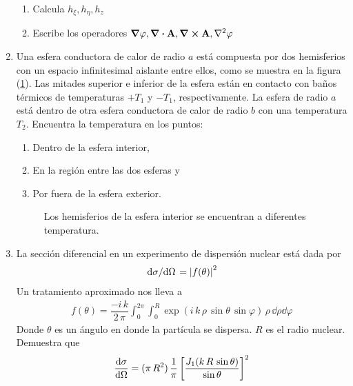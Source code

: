 \begin{enumerate}
\begin{enumerate}
    \item Calcula $h_{\xi}, h_{\eta}, h_{z}$
    \item Escribe los operadores $\grad{\varphi}, \div{\vb{A}}, \curl \vb{A}, \laplacian{\varphi}$
    \end{enumerate}
    \item Una esfera conductora de calor de radio $a$ está compuesta por dos hemisferios con un espacio infinitesimal aislante entre ellos, como se muestra en la figura (\ref{fig:figura2}). Las mitades superior e inferior de la esfera están en contacto con baños térmicos de temperaturas $+ T_{1}$ y $-T_{1}$, respectivamente. La esfera de radio $a$ está dentro de otra esfera conductora de calor de radio $b$ con una temperatura $T_{2}$. Encuentra la temperatura en los puntos:
    \begin{enumerate}
    \item Dentro de la esfera interior,
    \item En la región entre las dos esferas y
    \item Por fuera de la esfera exterior.
    \end{enumerate} 
    \begin{figure}[!ht]
        \centering
        
        \caption{Los hemisferios de la esfera interior se encuentran a diferentes temperatura.}
        \label{fig:figura2}
    \end{figure}
\item La sección diferencial en un experimento de dispersión nuclear está dada por 
\begin{align*}
\dv*{\sigma}{\Omega} = \abs{f(\theta)}^{2}
\end{align*}
Un tratamiento aproximado nos lleva a
\begin{align*}
f(\theta) = \dfrac{- i \, k}{2 \, \pi} \int_{0}^{2 \pi} \int_{0}^{R} \exp(i \, k \, \rho \, \sin \theta \, \sin \varphi ) \,  \rho \, \dd{\rho} \dd{\varphi}
\end{align*}
Donde $\theta$ es un ángulo en donde la partícula se dispersa. $R$ es el radio nuclear. Demuestra que
\begin{align*}
\dv{\sigma}{\Omega} = (\pi \, R^{2}) \, \dfrac{1}{\pi} \left[ \dfrac{J_{1} (k \, R \, \sin \theta)}{\sin \theta} \right]^{2}
\end{align*}

\end{enumerate}
